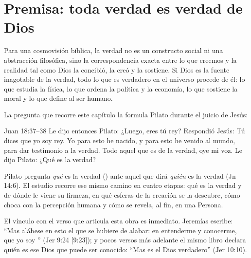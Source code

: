 
\section{Premisa: toda verdad es verdad de Dios}

Para una cosmovisión bíblica, la verdad no es un constructo social ni una abstracción filosófica, sino la correspondencia exacta entre lo que creemos y la realidad tal como Dios la concibió, la creó y la sostiene. Si Dios es la fuente inagotable de la verdad, todo lo que es verdadero en el universo procede de él: lo que estudia la física, lo que ordena la política y la economía, lo que sostiene la moral y lo que define al ser humano.


La pregunta que recorre este capítulo la formula Pilato durante el juicio de Jesús:

\begin{verso}{Juan 18:37–38}
Le dijo entonces Pilato: ¿Luego, eres tú rey? Respondió Jesús: Tú dices que yo soy rey. Yo para esto he nacido, y para esto he venido al mundo, para dar testimonio a la verdad. Todo aquel que es de la verdad, oye mi voz. Le dijo Pilato: ¿Qué es la verdad?
\end{verso}

Pilato pregunta \emph{qué} es la verdad () ante aquel que dirá \emph{quién} es la verdad (Jn 14:6). El estudio recorre ese mismo camino en cuatro etapas: qué es la verdad y de dónde le viene su firmeza, en qué esferas de la creación se la descubre, cómo choca con la percepción humana y cómo se revela, al fin, en una Persona.

El vínculo con el verso que articula esta obra es inmediato. Jeremías escribe: ``Mas alábese en esto el que se hubiere de alabar: en entenderme y conocerme, que yo soy \SENOR'' (Jer 9:24 [9:23]); y pocos versos más adelante el mismo libro declara quién es ese Dios que puede ser conocido: ``Mas \SENOR{} es el Dios verdadero'' (Jer 10:10).


